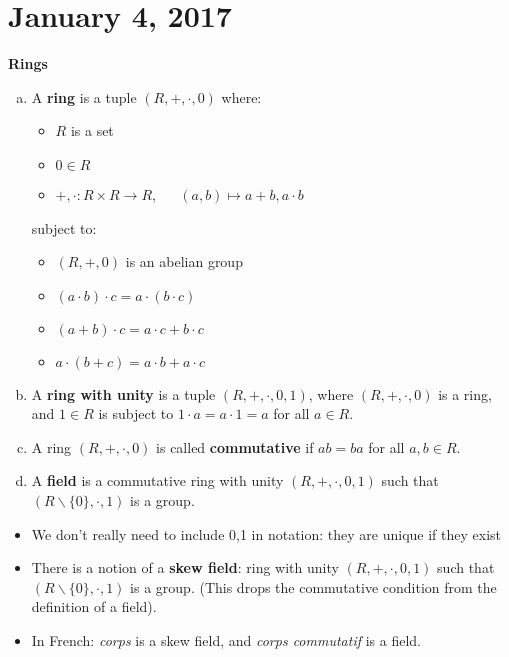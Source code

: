 \section{January 4, 2017} %
\noindent \textbf{Rings}
\begin{defn} \hspace{0.5cm}
    \begin{enumerate}[a)]
    \item A \textbf{ring} is a tuple $(R, +, \cdot, 0)$ where:
    \begin{itemize}
        \item $R$ is a set
        \item $0 \in R$
        \item $+,\cdot: R \times R \rightarrow R$, $\quad$  $(a,b) \mapsto a + b, a \cdot b$
    \end{itemize}
    subject to:
    \begin{itemize}
        \item $(R, +, 0)$ is an abelian group
        \item $(a \cdot b) \cdot c = a \cdot (b \cdot c)$
        \item $(a + b) \cdot c = a \cdot c + b \cdot c$
        \item $a \cdot (b + c) = a \cdot b + a \cdot c$
    \end{itemize}
    \item A \textbf{ring with unity} is a tuple $(R, +, \cdot, 0, 1)$, where
    $(R,+,\cdot,0)$ is a ring, and $1 \in R$ is subject to $1 \cdot a = a \cdot 1 = a$
    for all $a \in R$.
    \item A ring $(R, +, \cdot, 0)$ is called \textbf{commutative} if $ab = ba$ for all
    $a, b \in R$.
    \item A \textbf{field} is a commutative ring with unity $(R,+,\cdot,0,1)$ such
    that $(R \backslash \{0\}, \cdot, 1)$ is a group.
    \end{enumerate}
\end{defn}
\begin{rmk} \hspace{0.5cm}
    \begin{itemize}
        \item We don't really need to include 0,1 in notation: they are unique
        if they exist
        \item There is a notion of a \textbf{skew field}: ring with unity
        $(R,+,\cdot,0,1)$ such that $(R \backslash \{0\}, \cdot , 1)$ is a group.
        (This drops the commutative condition from the definition of a field).
        \item In French: \textit{corps} is a skew field, and \textit{corps commutatif} is a field.
    \end{itemize}
\end{rmk}
